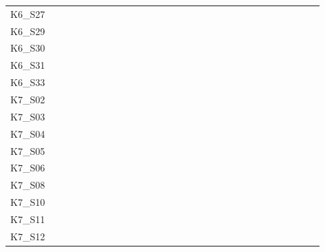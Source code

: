 \begin{table}
\begin{tabular}{l|rrrrrrrrrrrrrrrrrrrrrrrrrrrr}
        K6\_S27 & \y & \y & \y & \y & \y & \y & \y & \y & \y & \y & \y & \y & \y & \y & \y & \y & \y & \y & \y & \y & \y & \y & \y & \y & \y & \y & \y & \y \\
        K6\_S29 & \y & \y & \y & \y & \y & \y & \y & \y & \y & \y & \y & \y & \y & \y & \y & \y & \y & \y & \y & \y & \y & \y & \y & \y & \y & \y & \y & \y \\
        K6\_S30 & \y & \y & \y & \y & \y & \y & \y & \y & \y & \y & \y & \y & \y & \y & \y & \y & \y & \y & \y & \y & \y & \y & \y & \y & \y & \y & \y & \y \\
        K6\_S31 & \y & \y & \y & \y & \y & \y & \y & \y & \y & \y & \y & \y & \y & \y & \y & \y & \y & \y & \y & \y & \y & \y & \y & \y & \y & \y & \y & \y \\
        K6\_S33 & \y & \y & \y & \y & \y & \y & \y & \x & \y & \y & \y & \y & \y & \y & \y & \y & \y & \y & \y & \y & \y & \y & \y & \y & \y & \y & \y & \y \\
        K7\_S02 & \y & \y & \y & \y & \y & \y & \y & \y & \y & \y & \y & \y & \y & \y & \y & \y & \y & \y & \y & \y & \x & \y & \y & \y & \y & \y & \x & \y \\
        K7\_S03 & \y & \y & \y & \y & \y & \y & \y & \y & \y & \y & \y & \y & \x & \y & \y & \y & \y & \y & \y & \y & \y & \y & \y & \y & \y & \y & \y & \y \\
        K7\_S04 & \y & \y & \y & \y & \y & \y & \y & \y & \y & \y & \y & \y & \y & \y & \y & \y & \y & \y & \y & \y & \y & \y & \y & \y & \y & \y & \y & \y \\
        K7\_S05 & \y & \y & \y & \y & \y & \y & \y & \y & \y & \y & \y & \y & \y & \y & \y & \y & \y & \y & \y & \y & \y & \y & \y & \y & \y & \y & \y & \y \\
        K7\_S06 & \y & \y & \y & \y & \y & \y & \y & \y & \y & \y & \y & \y & \y & \y & \y & \y & \y & \y & \y & \y & \y & \y & \y & \y & \y & \y & \y & \y \\
        K7\_S08 & \y & \y & \y & \y & \y & \y & \y & \y & \y & \y & \y & \y & \y & \y & \y & \y & \y & \y & \y & \y & \y & \y & \y & \y & \y & \y & \y & \y \\
        K7\_S10 & \y & \y & \y & \y & \y & \y & \y & \y & \y & \y & \y & \y & \y & \y & \y & \y & \y & \y & \y & \y & \x & \y & \y & \y & \y & \y & \y & \y \\
        K7\_S11 & \y & \y & \y & \y & \y & \y & \y & \y & \y & \y & \y & \y & \y & \y & \y & \y & \y & \y & \y & \y & \y & \y & \y & \y & \y & \y & \y & \y \\
        K7\_S12 & \y & \y & \y & \y & \y & \y & \y & \y & \y & \y & \y & \y & \y & \x & \y & \y & \y & \y & \y & \y & \y & \y & \y & \y & \y & \y & \y & \y \\

\end{tabular}
\end{table}

